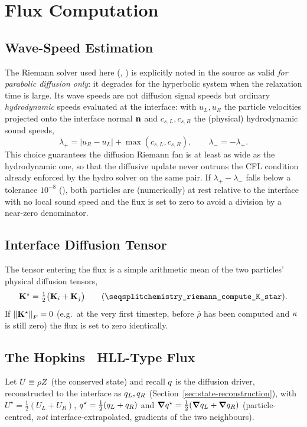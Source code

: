 \section{Flux Computation}
\label{sec:flux-computation}

\subsection{Wave-Speed Estimation}
The Riemann solver used here (,
) is explicitly noted in
the source as valid \emph{for parabolic diffusion only}: it degrades
for the hyperbolic system when the relaxation time is large. Its wave
speeds are not diffusion signal speeds but ordinary \emph{hydrodynamic}
speeds evaluated at the interface: with $u_L, u_R$ the particle
velocities projected onto the interface normal $\mathbf{n}$ and
$c_{s,L}, c_{s,R}$ the (physical) hydrodynamic sound speeds,
\begin{equation}
  \lambda_+ = |u_R - u_L| + \max(c_{s,L}, c_{s,R}) , \qquad \lambda_- = -\lambda_+ .
\end{equation}
This choice guarantees the diffusion Riemann fan is at
least as wide as the hydrodynamic one, so that the diffusive update never
outruns the CFL condition already enforced by the hydro solver on the
same pair. If $\lambda_+-\lambda_- $ falls below a tolerance
$10^{-8}$ (),
both particles are (numerically) at rest relative to the interface with
no local sound speed and the flux is set to zero to avoid a division by
a near-zero denominator.

\subsection{Interface Diffusion Tensor}
The tensor entering the flux is a simple arithmetic mean of the two
particles' physical diffusion tensors,
\begin{equation}
  \Kstar = \tfrac12\big(\Kmat_i + \Kmat_j\big)
  \qquad(\code{chemistry\_riemann\_compute\_K\_star}) .
\end{equation}
If $\norm{\mathbf{K}^{\star}}_F = 0$ (e.g.\ at the very first timestep, before
$\bar\rho$ has been computed and $\kappa$ is still zero) the flux is
set to zero identically.

\subsection{The Hopkins~\citeyear{Hopkins2017diffusion} HLL-Type Flux}
\label{sec:hll-flux}
Let $U \equiv \rho Z$ (the conserved state) and recall $q$ is the
diffusion driver, reconstructed to the interface as $q_L,
q_R$ (Section~\ref{sec:state-reconstruction}), with
$U^\star = \tfrac12(U_L+U_R)$, $q^\star = \tfrac12(q_L +
q_R)$ and $\grad q^\star = \tfrac12(\grad q_L +
\grad q_R)$ (particle-centred, \emph{not} interface-extrapolated,
gradients of the two neighbours).

